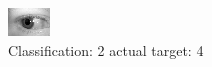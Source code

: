 \begin{figure}[h!]
\begin{center}
\includegraphics[width=0.60\columnwidth]{figures/ID806_class_2_target_4.png}
\end{center}
\caption{ Classification: 2 actual target: 4}
\label{fig:ID806_class_2_target_4}
\end{figure}
